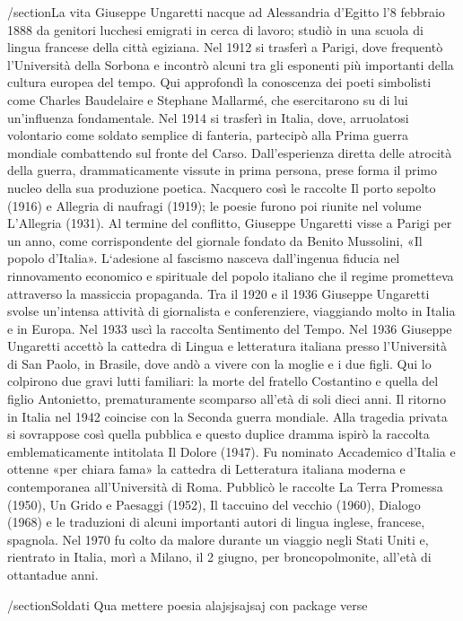 /section{La vita}
Giuseppe Ungaretti nacque ad Alessandria d’Egitto l’8 febbraio 1888 da genitori lucchesi emigrati in cerca di lavoro; studiò in una scuola di lingua francese della città egiziana.
Nel 1912 si trasferì a Parigi, dove frequentò l’Università della Sorbona e incontrò alcuni tra gli esponenti più importanti della cultura europea del tempo. Qui approfondì la conoscenza dei poeti simbolisti come Charles Baudelaire e Stephane Mallarmé, che esercitarono su di lui un’influenza fondamentale.
Nel 1914 si trasferì in Italia, dove, arruolatosi volontario come soldato semplice di fanteria, partecipò alla Prima guerra mondiale combattendo sul fronte del Carso.  Dall’esperienza diretta delle atrocità della guerra, drammaticamente vissute in prima persona, prese forma il primo nucleo della sua produzione poetica. Nacquero così le raccolte Il porto sepolto (1916) e Allegria di naufragi (1919); le poesie furono poi riunite nel volume L’Allegria (1931).
Al termine del conflitto, Giuseppe Ungaretti visse a Parigi per un anno, come corrispondente del giornale fondato da Benito Mussolini, «Il popolo d’Italia». L‘adesione al fascismo nasceva dall’ingenua fiducia nel rinnovamento economico e spirituale del popolo italiano che il regime prometteva attraverso la massiccia propaganda.
Tra il 1920 e il 1936 Giuseppe Ungaretti svolse un’intensa attività di giornalista e conferenziere, viaggiando molto in Italia e in Europa. Nel 1933 uscì la raccolta Sentimento del Tempo.
Nel 1936 Giuseppe Ungaretti accettò la cattedra di Lingua e letteratura italiana presso l’Università di San Paolo, in Brasile, dove andò a vivere con la moglie e i due figli. Qui lo colpirono due gravi lutti familiari: la morte del fratello Costantino e quella del figlio Antonietto, prematuramente scomparso all’età di soli dieci anni.
Il ritorno in Italia nel 1942 coincise con la Seconda guerra mondiale. Alla tragedia privata si sovrappose così quella pubblica e questo duplice dramma ispirò la raccolta emblematicamente intitolata Il Dolore (1947). Fu nominato Accademico d’Italia e ottenne «per chiara fama» la cattedra di Letteratura italiana moderna e contemporanea all’Università di Roma.
Pubblicò le raccolte La Terra Promessa (1950), Un Grido e Paesaggi (1952), Il taccuino del vecchio (1960), Dialogo (1968) e le traduzioni di alcuni importanti autori di lingua inglese, francese, spagnola.
Nel 1970 fu colto da malore durante un viaggio negli Stati Uniti e, rientrato in Italia, morì a Milano, il 2 giugno, per broncopolmonite, all’età di ottantadue anni.

/section{Soldati}
Qua mettere poesia alajsjsajsaj con package verse

